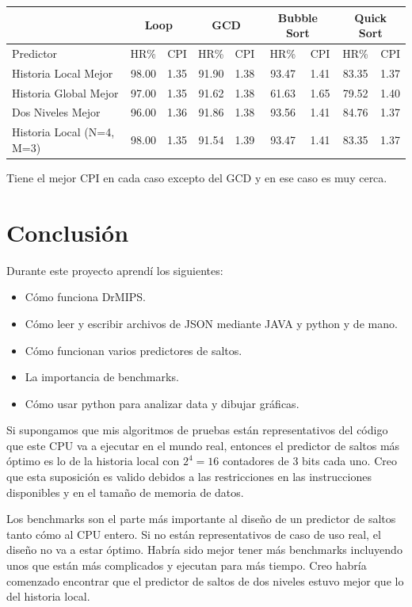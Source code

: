 \documentclass[a4paper]{article}
\begin{document}
\begin{tabular}{|l|rr|rr|rr|rr|}
\cline{2-9}
\multicolumn{1}{c}{} & \multicolumn{2}{|c}{Loop} & \multicolumn{2}{|c}{GCD} & \multicolumn{2}{|c}{Bubble Sort} & \multicolumn{2}{|c|}{Quick Sort} \\ \hline
Predictor & HR\% & CPI & HR\% & CPI & HR\% & CPI & HR\% & CPI \\ \hline
Historia Local Mejor & 98.00	& 1.35 & 91.90 & 1.38 & 93.47 & 1.41 & 83.35 & 1.37 \\
Historia Global	Mejor & 97.00	& 1.35 & 91.62 & 1.38 & 61.63 & 1.65 & 79.52 & 1.40 \\
Dos Niveles Mejor & 96.00	& 1.36 & 91.86 & 1.38 & 93.56 & 1.41 & 84.76 & 1.37 \\ \hline
Historia Local (N=4, M=3) & 98.00	& 1.35 & 91.54 & 1.39 & 93.47 & 1.41 & 83.35 & 1.37 \\
\hline
\end{tabular}

Tiene el mejor CPI en cada caso excepto del GCD y en ese caso es muy cerca.

\section{Conclusión}

Durante este proyecto aprendí los siguientes:

\begin{itemize}
    \item Cómo funciona DrMIPS.
    \item Cómo leer y escribir archivos de JSON mediante JAVA y python y de mano.
    \item Cómo funcionan varios predictores de saltos.
    \item La importancia de benchmarks.
    \item Cómo usar python para analizar data y dibujar gráficas.
\end{itemize}

Si supongamos que mis algoritmos de pruebas están representativos del código que este CPU va a ejecutar en el mundo real, entonces el predictor de saltos más óptimo es lo de la historia local con $2^4 = 16$ contadores de 3 bits cada uno. Creo que esta suposición es valido debidos a las restricciones en las instrucciones disponibles y en el tamaño de memoria de datos.

Los benchmarks son el parte más importante al diseño de un predictor de saltos tanto cómo al CPU entero. Si no están representativos de caso de uso real, el diseño no va a estar óptimo. Habría sido mejor tener más benchmarks incluyendo unos que están más complicados y ejecutan para más tiempo. Creo habría comenzado encontrar que el predictor de saltos de dos niveles estuvo mejor que lo del historia local.
\end{document}

